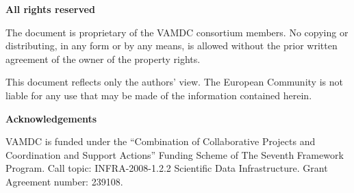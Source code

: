 {\textbf{}

\noindent \textbf{All rights reserved}

\noindent The document is proprietary of the VAMDC consortium members. No copying or distributing, in any form or by any means, is allowed without the prior written agreement of the owner of the property rights.

\noindent 

\noindent This document reflects only the authors' view. The European Community is not liable for any use that may be made of the information contained herein.

\textbf{}

\noindent \textbf{Acknowledgements}

\noindent VAMDC is funded under the ``Combination of Collaborative Projects and Coordination and  Support Actions'' Funding Scheme of The Seventh Framework Program. Call topic: INFRA-2008-1.2.2 Scientific Data Infrastructure. Grant Agreement number: 239108.

\textbf{}

}